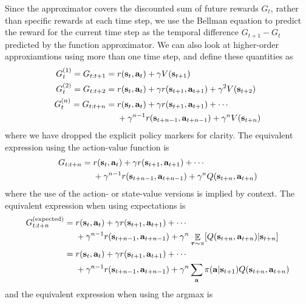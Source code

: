 \documentclass{article}
\begin{document}
Since the approximator covers the discounted sum of future rewards $G_t$, rather than specific rewards at each time step, we use the Bellman equation to predict the reward for the current time step as the temporal difference $G_{t+1}-G_t$ predicted by the function approximator. We can also look at higher-order approxiamtions using more than one time step, and define these quantities as \begin{equation}\begin{split}
G_t^{(1)}=G_{t:t+1}&=r(\mathbf{s}_t,\mathbf{a}_t)+\gamma V (\mathbf{s}_{t+1})\\G_t^{(2)}=G_{t:t+2}&=r(\mathbf{s}_t,\mathbf{a}_t)+\gamma r(\mathbf{s}_{t+1},\mathbf{a}_{t+1})+\gamma^2 V (\mathbf{s}_{t+2})\\G_t^{(n)}=G_{t:t+n}&=r(\mathbf{s}_t,\mathbf{a}_t)+\gamma r(\mathbf{s}_{t+1},\mathbf{a}_{t+1})+\cdots\\&\nobreakspace\nobreakspace\nobreakspace\nobreakspace+\gamma^{n-1}r(\mathbf{s}_{t+n-1},\mathbf{a}_{t+n-1})+\gamma^n V (\mathbf{s}_{t+n})\end{split}\end{equation} where we have dropped the explicit policy markers for clarity.  The equivalent expression using the action-value function is \begin{equation}\begin{split}G_{t:t+n}&=r(\mathbf{s}_t,\mathbf{a}_t)+\gamma r(\mathbf{s}_{t+1},\mathbf{a}_{t+1})+\cdots\\&\nobreakspace\nobreakspace\nobreakspace\nobreakspace+\gamma^{n-1}r(\mathbf{s}_{t+n-1},\mathbf{a}_{t+n-1})+\gamma^n Q (\mathbf{s}_{t+n},\mathbf{a}_{t+n})\end{split}\end{equation} where the use of the action- or state-value versions is implied by context. The equivalent expression when using expectations is \begin{equation}\begin{split}
G_{t:t+n}^{(\text{expected})}&=r(\mathbf{s}_t,\mathbf{a}_t)+\gamma r(\mathbf{s}_{t+1},\mathbf{a}_{t+1})+\cdots\\&\nobreakspace\nobreakspace\nobreakspace\nobreakspace+\gamma^{n-1}r(\mathbf{s}_{t+n-1},\mathbf{a}_{t+n-1})+\gamma^n \mathop{\mathbb{E}}_{\boldsymbol{\tau}\sim\pi}[Q (\mathbf{s}_{t+n},\mathbf{a}_{t+n})|\mathbf{s}_{t+n}]\\&=r(\mathbf{s}_t,\mathbf{a}_t)+\gamma r(\mathbf{s}_{t+1},\mathbf{a}_{t+1})+\cdots\\&\nobreakspace\nobreakspace\nobreakspace\nobreakspace+\gamma^{n-1}r(\mathbf{s}_{t+n-1},\mathbf{a}_{t+n-1})+\gamma^n \sum_\mathbf{a}\pi(\mathbf{a}|\mathbf{s}_{t+1})Q (\mathbf{s}_{t+n},\mathbf{a}_{t+n})\\\end{split}\end{equation}and the equivalent expression when using the argmax is \begin{equation}\begin{split}

\end{split}
\end{equation}
\end{document}
